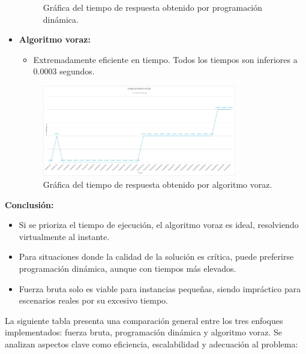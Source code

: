 \documentclass[11pt,letter]{article}
\begin{document}
\begin{itemize}
\begin{figure}[H]
            \caption{Gráfica del tiempo de respuesta obtenido por programación dinámica.}
        \end{figure}
        \item \textbf{Algoritmo voraz:}
        \begin{itemize}
            \item Extremadamente eficiente en tiempo. Todos los tiempos son inferiores a 0.0003 segundos.
        \end{itemize}
        \begin{figure}[H]
            \centering
            \includegraphics[width=0.8\textwidth]{resources/tiempo4.jpeg}
            \caption{Gráfica del tiempo de respuesta obtenido por algoritmo voraz.}
        \end{figure}
    \end{itemize}

    \textbf{Conclusión:}
\begin{itemize}
    \item Si se prioriza el tiempo de ejecución, el algoritmo voraz es ideal, resolviendo virtualmente al instante.
    \item Para situaciones donde la calidad de la solución es crítica, puede preferirse programación dinámica, aunque con tiempos más elevados.
    \item Fuerza bruta solo es viable para instancias pequeñas, siendo impráctico para escenarios reales por su excesivo tiempo.
\end{itemize}

La siguiente tabla presenta una comparación general entre los tres enfoques implementados: fuerza bruta, programación dinámica y algoritmo voraz. Se analizan aspectos clave como eficiencia, escalabilidad y adecuación al problema:
\end{document}
